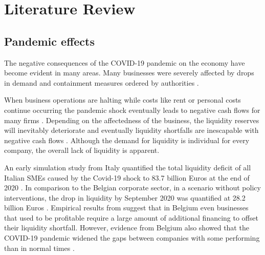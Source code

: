 
\chapter{Literature Review} %

\label{Chapter2} %


\section{Pandemic effects}

The negative consequences of the COVID-19 pandemic on the economy have become evident in many areas. Many businesses were severely affected by drops in demand and containment measures ordered by authorities \parencite{eu_com_temporary_2020}.

When business operations are halting while costs like rent or personal costs continue occurring the pandemic shock eventually leads to negative cash flows for many firms \parencite{fernandez-cerezo_firm-level_2021}.
Depending on the affectedness of the business, the liquidity reserves will inevitably deteriorate and eventually liquidity shortfalls are inescapable with negative cash flows \parencite{puhr_have_2021}. Although the demand for liquidity is individual for every company, the overall lack of liquidity is apparent. 

An early simulation study from Italy quantified the total liquidity deficit of all Italian SMEs caused by the Covid-19 shock to 83.7 billion Euros at the end of 2020 \parencite{bellucci_consequences_2022}. In comparison to the Belgian corporate sector, in a scenario without policy interventions, the drop in liquidity by September 2020 was quantified at 28.2 billion Euros \parencite{tielens_belgian_2020}. Empirical results from \parencite{tielens_belgian_2020} suggest that in Belgium even businesses that used to be profitable require a large amount of additional financing to offset their liquidity shortfall. 
However, evidence from Belgium also showed that the COVID-19 pandemic widened the gaps between companies with some performing than in normal times \parencite{dhyne_belgian_2021}.  


